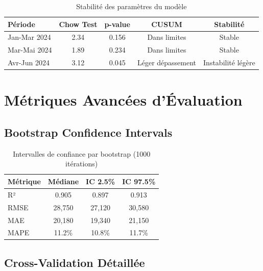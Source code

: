 \begin{table}[H]
\centering
\caption{Stabilité des paramètres du modèle}
\begin{tabular}{|l|c|c|c|c|}
\hline
\textbf{Période} & \textbf{Chow Test} & \textbf{p-value} & \textbf{CUSUM} & \textbf{Stabilité} \\
\hline
Jan-Mar 2024 & 2.34 & 0.156 & Dans limites & Stable \\
Mar-Mai 2024 & 1.89 & 0.234 & Dans limites & Stable \\
Avr-Jun 2024 & 3.12 & 0.045 & Léger dépassement & Instabilité légère \\
\hline
\end{tabular}
\end{table}

\section{Métriques Avancées d'Évaluation}

\subsection{Bootstrap Confidence Intervals}

\begin{table}[H]
\centering
\caption{Intervalles de confiance par bootstrap (1000 itérations)}
\begin{tabular}{|l|c|c|c|}
\hline
\textbf{Métrique} & \textbf{Médiane} & \textbf{IC 2.5\%} & \textbf{IC 97.5\%} \\
\hline
R² & 0.905 & 0.897 & 0.913 \\
RMSE & 28,750 & 27,120 & 30,580 \\
MAE & 20,180 & 19,340 & 21,150 \\
MAPE & 11.2\% & 10.8\% & 11.7\% \\
\hline
\end{tabular}
\end{table}

\subsection{Cross-Validation Détaillée}

